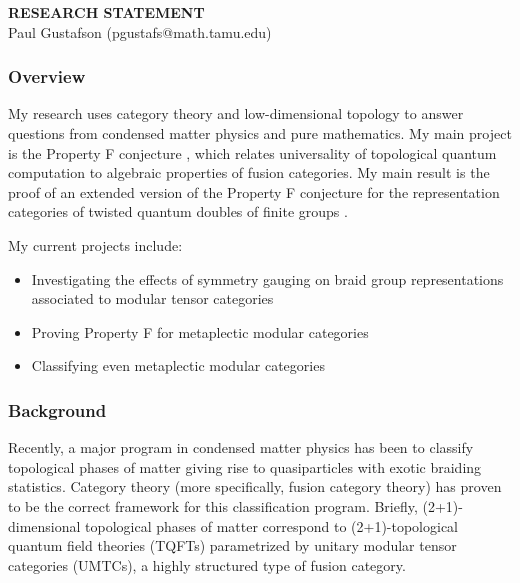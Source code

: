 \documentclass[12pt]{article}
\theoremstyle{plain} \numberwithin{equation}{section}
\theoremstyle{definition}
\begin{document}
\begin{center}
{\bf RESEARCH STATEMENT}\\
\vspace*{0.1cm}
{\normalsize Paul Gustafson (pgustafs@math.tamu.edu)}
\end{center}




\subsubsection*{Overview}

My research uses category theory and low-dimensional topology to answer questions from condensed matter physics and pure mathematics.   My main project is the Property F conjecture \cite{nr}, which relates universality of topological quantum computation to algebraic properties of fusion categories.  My main result is the proof of  an extended version of the Property F conjecture for the representation categories of twisted quantum doubles of finite groups \cite{g}. 

My current projects include:
\begin{itemize}
\item Investigating the effects of symmetry gauging on braid group representations associated to modular tensor categories
\item Proving Property F for metaplectic modular categories
\item Classifying even metaplectic modular categories
\end{itemize}

\subsubsection*{Background}

Recently, a major program in condensed matter physics has been to classify topological phases of matter giving rise to quasiparticles with exotic braiding statistics. Category theory (more specifically, fusion category theory) has proven to be the correct framework for this classification program. Briefly, (2+1)-dimensional topological phases of matter correspond to (2+1)-topological quantum field theories (TQFTs) parametrized by unitary modular tensor categories (UMTCs), a highly structured type of fusion category. 
\end{document}
